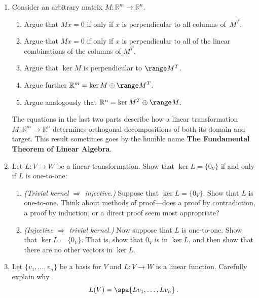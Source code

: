 


\begin{enumerate}

\item 
Consider an arbitrary matrix $M:\mathbb{R}^m\to \mathbb{R}^n.$
\begin{enumerate}
\item Argue that $Mx=0$ if only if $x$ is perpendicular to all columns of~$M^T$.
\item Argue that $Mx=0$ if only if $x$ is perpendicular to all of the linear combinations of the columns of $M^T$.
\item Argue that $\ker M$ is perpendicular to $\range M^T$. 
\item Argue further $\mathbb{R}^m=\ker M \oplus \range M^T$. 
\item Argue analogously that $\mathbb{R}^n=\ker M^T \oplus \range M$. 
\end{enumerate} 
The equations in the last two parts describe how a linear transformation $M:\mathbb{R}^m\to \mathbb{R}^n$ determines orthogonal decompositions of both its domain and target. This result sometimes goes by the humble name {\bf{The Fundamental Theorem of Linear Algebra}}.




\item \label{injectivekernalprob} Let $L \colon V\rightarrow W$ be a linear transformation.  Show that $\ker L=\{0_V\}$ if and only if $L$ is one-to-one:
\begin{enumerate}
\item {\itshape (Trivial kernel $\Rightarrow$ injective.)} Suppose that \(\ker L=\{0_V\}\). Show that \(L\) is one-to-one. Think about methods of proof---does a proof by contradiction, a proof by induction, or a direct proof seem most appropriate?
\item {\itshape (Injective $\Rightarrow$ trivial kernel.)} Now suppose that \(L\) is one-to-one. Show that \(\ker L=\{0_V\}\). That is, show that \(0_V\) is in \(\ker L\), and then show that there are no other vectors in \(\ker L\).
\end{enumerate}

\item Let $\{v_1, \ldots, v_n  \}$ be a basis for $V$ and $L:V\to W$ is a linear function. Carefully explain why
\[
L(V)=\spa \{Lv_1, \ldots, Lv_n \}\, .
\]



\end{enumerate}
